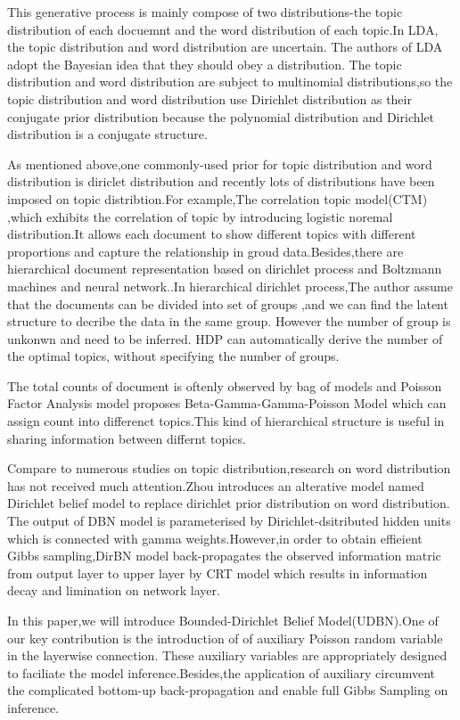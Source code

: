 This generative process is mainly compose of two distributions-the topic distribution of each docuemnt and the word distribution of each topic.In LDA, the topic distribution and word distribution are uncertain. The authors of LDA adopt the Bayesian idea that they should obey a distribution. The topic distribution and word distribution are subject to  multinomial distributions,so the topic distribution and word distribution use Dirichlet distribution as their conjugate prior distribution because the polynomial distribution and Dirichlet distribution is a conjugate structure.

As mentioned above,one commonly-used prior for topic distribution and word distribution is diriclet distribution and recently lots of distributions have been imposed on topic distribtion.For example,The correlation topic model(CTM) \cite{corr} ,which exhibits the correlation of topic by introducing logistic noremal distribution.It allows each document to show different topics with different proportions and capture the relationship in groud data.Besides,there are hierarchical document representation based on dirichlet process and Boltzmann machines and neural network.\cite{zhao}.In hierarchical dirichlet process,The author assume that the documents can be divided into set of groups ,and we can find the latent structure to  decribe the data in the same group. However the number of group is unkonwn and need to be inferred. HDP  can automatically derive the number of the optimal topics, without specifying the number of groups.

The total counts of document is oftenly observed by bag of models and Poisson Factor Analysis model\cite{han} proposes Beta-Gamma-Gamma-Poisson Model which can assign count into differenct topics.This kind of hierarchical structure is useful in sharing information between differnt topics.

Compare to numerous studies on topic distribution,research on word distribution has not received much attention.Zhou \cite{dirbn} introduces an alterative model named Dirichlet belief model to replace dirichlet prior distribution on word distribution. The output of DBN model is parameterised by Dirichlet-dsitributed hidden units which is connected with gamma weights.However,in order to obtain effieient Gibbs sampling,DirBN model back-propagates the observed information matric from output layer to upper layer by CRT\cite{crt} model which results in information decay and limination on network layer.

In this paper,we will introduce Bounded-Dirichlet Belief Model(UDBN).One of our key contribution is the introduction of of auxiliary Poisson random variable in the layerwise connection. These auxiliary variables are appropriately designed to faciliate the model inference.Besides,the application of auxiliary circumvent the complicated bottom-up back-propagation and enable full Gibbs Sampling on inference.

